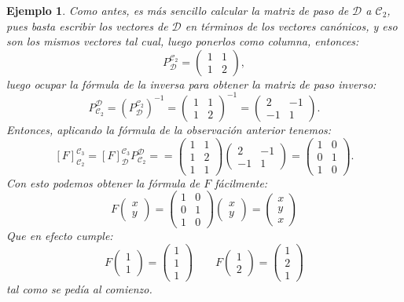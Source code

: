 \documentclass[12pt]{book}
\newtheorem{ejem}{Ejemplo}
\def\D{\mathcal{D}}
\def\Ccal{\mathcal{C}}
\begin{document}
\begin{ejem}
{    Como antes, es más sencillo calcular la matriz de paso de $\D$ a $\Ccal_2$, pues basta escribir los vectores de $\D$ en términos de los vectores canónicos, y eso son los mismos vectores tal cual, luego ponerlos como columna, entonces:
    $$P_\D^{\Ccal_2}=\left(\begin{array}{rr} 1& 1\\ 1 & 2\end{array}\right),$$
   luego ocupar la fórmula de la inversa para obtener la matriz de paso inverso:
   $$P_{\Ccal_2}^\D=(P_\D^{\Ccal_2})^{-1}=\left(\begin{array}{rr} 1& 1\\ 1 & 2\end{array}\right)^{-1}=\left(\begin{array}{rr} 2& -1\\ -1 & 1\end{array}\right).$$
Entonces, aplicando la fórmula de la observación anterior tenemos:
$$[F]_{\Ccal_2}^{\Ccal_3}=[F]_{\D}^{\Ccal_3}P_{\Ccal_2}^\D=
  =\left(\begin{array}{cc} 1& 1\\ 1 & 2\\1&1\end{array}\right)\left(\begin{array}{rr} 2& -1\\ -1 & 1\end{array}\right)
  =\left(\begin{array}{cc} 1&0\\0&1\\1&0\end{array}\right).$$
Con esto podemos obtener la fórmula de $F$ fácilmente:
$$F\left(\begin{array}{c}x\\y\end{array}\right)=\left(\begin{array}{cc} 1&0\\0&1\\1&0\end{array}\right)\left(\begin{array}{c}x\\y\end{array}\right)=\left(\begin{array}{c}x\\y\\x\end{array}\right)$$
Que en efecto cumple:
$$F\left(\begin{array}{c}1\\1\end{array}\right)=\left(\begin{array}{c}1\\1\\1\end{array}\right)\qquad F\left(\begin{array}{c}1\\2\end{array}\right)=\left(\begin{array}{c}1\\2\\1\end{array}\right)$$
tal como se pedía al comienzo.
}
\end{ejem}
\end{document}
